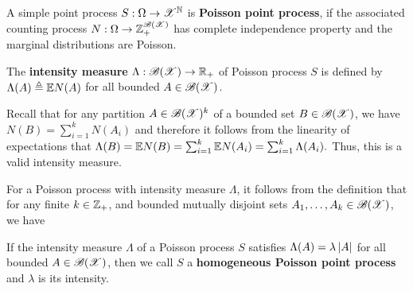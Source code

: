 \documentclass[letterpaper,10pt,english]{article}
\begin{document}
\begin{defn}
A simple point process $S: \Omega \to \mathscr{X}^{\mathbb{N}}$ is \textbf{Poisson point process}, 
if the associated counting process $N: \Omega \to \mathbb{Z}_+^{\mathscr{B}(\mathscr{X})}$ has complete independence property and the marginal distributions are Poisson. 
\end{defn}
\begin{defn}
The \textbf{intensity measure} $\Lambda: \mathscr{B}(\mathscr{X}) \to \mathbb{R}_+$ of Poisson process $S$ is defined by $\Lambda(A) \triangleq \mathbb{E} N(A)$ for all bounded $A \in \mathscr{B}(\mathscr{X})$. 
\end{defn}
\begin{rem}
Recall that for any partition $A \in \mathscr{B}(\mathscr{X})^k$ of a bounded set $B \in \mathscr{B}(\mathscr{X})$, we have $N(B) = \sum_{i=1}^kN(A_i)$ and therefore it follows from the linearity of expectations that $\Lambda(B) = \mathbb{E} N(B) = \sum_{i=1}^k\mathbb{E} N(A_i) = \sum_{i=1}^k\Lambda(A_i).$ 
Thus, this is a valid intensity measure. 
\end{rem}
\begin{rem}
For a Poisson process with intensity measure $\Lambda$, 
it follows from the definition that for any finite $k \in \mathbb{Z}_+$, 
and bounded mutually disjoint sets $A_1, \dots, A_k \in \mathscr{B}(\mathscr{X})$, we have  
\end{rem} 
\begin{defn}
If the intensity measure $\Lambda$ of a Poisson process $S$ satisfies $\Lambda(A) = \lambda\left\lvert A\right\rvert$ for all bounded $A \in \mathscr{B}(\mathscr{X})$, then we call $S$ a \textbf{homogeneous Poisson point process} and $\lambda$ is its intensity.  
\end{defn} 
\end{document}
